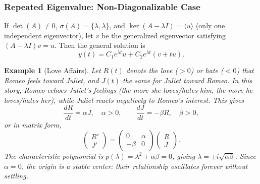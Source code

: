 \documentclass{article}
\newtheorem*{example}{Example}
\begin{document}
\subsubsection{Repeated Eigenvalue: Non-Diagonalizable Case}

If $\det(A) \neq 0$, $\sigma(A) = \{\lambda, \lambda\}$, and 
$\ker(A - \lambda I) = \langle u \rangle$ (only one independent 
eigenvector), let $v$ be the generalized eigenvector satisfying 
$(A - \lambda I)v = u$. Then the general solution is
\[y(t) = C_1 e^{\lambda t}u + C_2 e^{\lambda t}(v + tu).\]

\begin{example}[Love Affairs]
    Let $R(t)$ denote the love ($>0$) or hate ($<0$) that Romeo 
    feels toward Juliet, and $J(t)$ the same for Juliet toward Romeo.
    In this story, Romeo echoes Juliet's feelings (the more she 
    loves/hates him, the more he loves/hates her), while Juliet 
    reacts negatively to Romeo's interest. This gives
    \[\frac{dR}{dt} = \alpha J, \quad \alpha > 0, \qquad 
    \frac{dJ}{dt} = -\beta R, \quad \beta > 0,\]
    or in matrix form,
    \[\begin{pmatrix}R'\\J'\end{pmatrix} = 
    \begin{pmatrix}0&\alpha\\-\beta&0\end{pmatrix}
    \begin{pmatrix}R\\J\end{pmatrix}.\]
    The characteristic polynomial is $p(\lambda) = \lambda^2 + 
    \alpha\beta = 0$, giving $\lambda = \pm i\sqrt{\alpha\beta}$. 
    Since $\alpha = 0$, the origin is a \emph{stable center}: 
    their relationship oscillates forever without settling.


\end{example}
\end{document}
